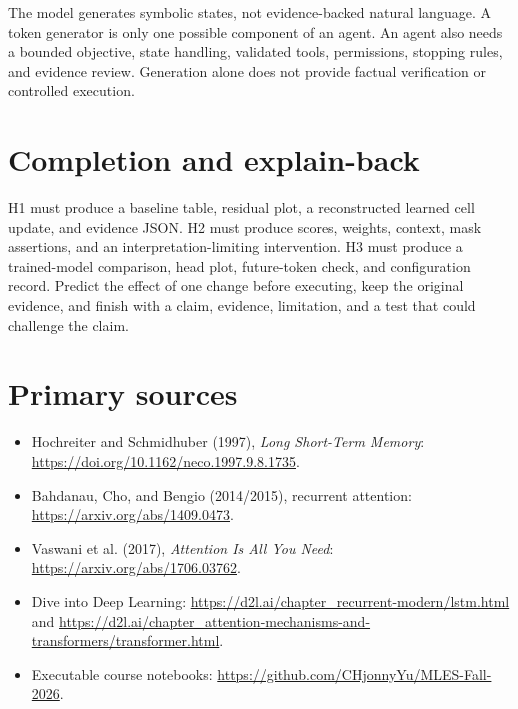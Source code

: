 The model generates symbolic states, not evidence-backed natural language.
A token generator is only one possible component of an agent. An agent
also needs a bounded objective, state handling, validated tools,
permissions, stopping rules, and evidence review. Generation alone does
not provide factual verification or controlled execution.

\section{Completion and explain-back}
H1 must produce a baseline table, residual plot, a reconstructed learned
cell update, and evidence JSON. H2 must produce scores, weights, context,
mask assertions, and an interpretation-limiting intervention. H3 must
produce a trained-model comparison, head plot, future-token check, and
configuration record. Predict the effect of one change before executing,
keep the original evidence, and finish with a claim, evidence, limitation,
and a test that could challenge the claim.

\section{Primary sources}
\begin{itemize}
\item Hochreiter and Schmidhuber (1997), \emph{Long Short-Term Memory}:
\url{https://doi.org/10.1162/neco.1997.9.8.1735}.
\item Bahdanau, Cho, and Bengio (2014/2015), recurrent attention:
\url{https://arxiv.org/abs/1409.0473}.
\item Vaswani et al. (2017), \emph{Attention Is All You Need}:
\url{https://arxiv.org/abs/1706.03762}.
\item Dive into Deep Learning:
\url{https://d2l.ai/chapter_recurrent-modern/lstm.html} and
\url{https://d2l.ai/chapter_attention-mechanisms-and-transformers/transformer.html}.
\item Executable course notebooks:
\url{https://github.com/CHjonnyYu/MLES-Fall-2026}.
\end{itemize}
